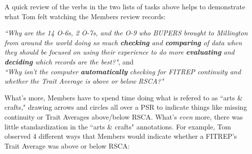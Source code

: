 \documentclass[UTF8]{article}
\begin{document}
A quick review of the verbs in the two lists of tasks above helps to demonstrate
what Tom felt watching the Members review records:\\

\begin{adjustwidth}{35pt}{35pt}

\indent \indent \textit{``Why are the 14 O-6s, 2 O-7s, and the O-9 who BUPERS brought
to Millington from around the world doing so much \textbf{checking} and
\textbf{comparing} of data when they should be focused on using their experience to
do more \textbf{evaluating} and \textbf{deciding} which records are the best?"}, and
\\

\indent \textit{``Why isn't the computer \textbf{automatically} checking for FITREP
continuity and whether the Trait Average is above or below RSCA?"}\\

\end{adjustwidth}

What's more, Members have to spend time doing what is refered to as
``arts \& crafts," drawing arrows and circles all over a PSR to indicate things like
missing continuity or Trait Averages above/below RSCA. What's \textit{even} more,
there was little standardization in the ``arts \& crafts" annotations. For example, Tom
observed 4 different ways that Members would indicate whether a FITREP's Trait
Average was above or below RSCA:
\end{document}
